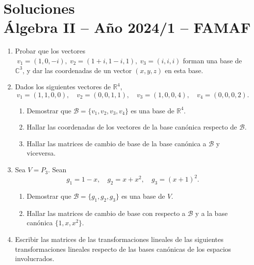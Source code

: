 \chapter{Soluciones\\Álgebra  II -- Año 2024/1 -- FAMAF}\label{practico-8}

\begin{enumerate}[topsep=6pt, itemsep=.4cm]

\item
Probar que los vectores $\;v_1=(1,0,-i),\;
v_2=(1+i,1-i,1),\;v_3=(i,i,i)$ forman una base de $\mathbb{C}^3$,
y dar las coordenadas de un vector $(x,y,z)$ en esta base.


\item Dados los siguientes vectores de $\mathbb{R}^4$,
$$
v_1=(1,1,0,0), \quad v_2=(0,0,1,1), \quad v_3=(1,0,0,4),
\quad v_4=(0,0,0,2).
$$
\begin{enumerate}
    \item Demostrar que
    $\mathcal{B}=\{v_1,v_2,v_3,v_4\}$ es una base de
    $\mathbb{R}^{4}$.
    \item Hallar las coordenadas de los vectores de la
    base can\'onica respecto de $\mathcal{B}$.
    \item Hallar las matrices de cambio de base de la base can\'onica
    a $\mathcal{B}$ y viceversa.
\end{enumerate}


\item  Sea $V=P_3$.
Sean
$$ g_1=1-x,\quad g_2=x+x^2, \quad g_3=(x+1)^2.$$
\begin{enumerate}
    \item Demostrar que $\mathcal{B}=\{g_1,g_2,g_3\}$ es una base de $V$.
    \item Hallar las matrices de cambio de base con respecto a $\mathcal{B}$
    y a la base can{\'o}nica $\{1,x,x^2\}$.
\end{enumerate}



\item \label{lineales1-bases} Escribir las matrices de las transformaciones lineales de las siguientes transformaciones lineales respecto de las bases canónicas de los espacios involucrados.


\end{enumerate}
